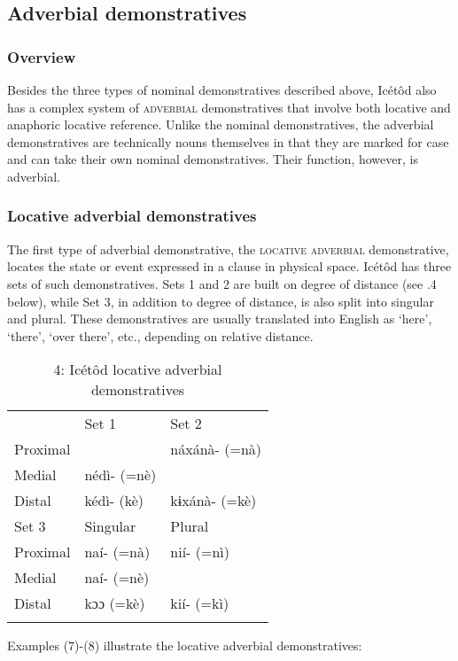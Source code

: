 \subsection{Adverbial demonstratives}
\subsubsection{Overview}

Besides the three types of nominal demonstratives described above, Icétôd also has a complex system of \textsc{adverbial }demonstratives that involve both locative and anaphoric locative reference. Unlike the nominal demonstratives, the adverbial demonstratives are technically nouns themselves in that they are marked for case and can take their own nominal demonstratives. Their function, however, is adverbial.


\subsubsection{Locative adverbial demonstratives}

The first type of adverbial demonstrative, the \textsc{locative adverbial} demonstrative, locates the state or event expressed in a clause in physical space. Icétôd has three sets of such demonstratives. Sets 1 and 2 are built on degree of distance (see .4 below), while Set 3, in addition to degree of distance, is also split into singular and plural. These demonstratives are usually translated into English as ‘here’, ‘there’, ‘over there’, etc., depending on relative distance. 


\begin{table}
\caption{4: Icétôd locative adverbial demonstratives}
\label{tab:6}


\begin{tabularx}{\textwidth}{XXX} & \multicolumn{1}{X}{Set 1} & Set 2\\
\lsptoprule
Proximal & \multicolumn{1}{X}{} & náxánà- (=nà)\\
Medial & \multicolumn{1}{X}{nédì- (=nè)} & \\
Distal & \multicolumn{1}{X}{kédì- (kè)} & kɨxánà- (=kè)\\
\multicolumn{1}{X}{Set 3} & Singular & Plural\\
Proximal & naí- (=nà) & nií- (=nì)\\
Medial & naí- (=nè) & \\
Distal & kɔɔ (=kè) & kií- (=kì)\\
\lspbottomrule
\end{tabularx}
\end{table}
Examples (7)-(8) illustrate the locative adverbial demonstratives:




